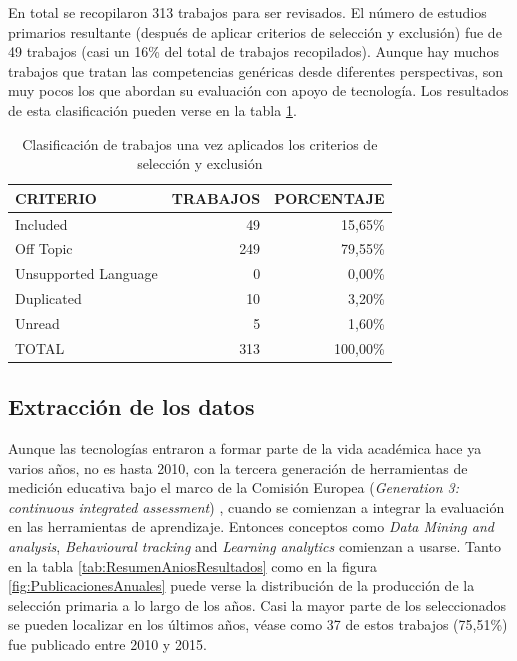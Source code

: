 En total se recopilaron 313 trabajos para ser revisados. El número de estudios primarios resultante (después de aplicar criterios de selección y exclusión) fue de 49 trabajos (casi un 16\% del total de trabajos recopilados). Aunque hay muchos trabajos que tratan las competencias genéricas desde diferentes perspectivas, son muy pocos los que abordan su evaluación con apoyo de tecnología. Los resultados de esta clasificación pueden verse en la tabla \ref{tab:ResumenSelecccionResultados}.

\begin{table}
  \begin{center}
  \begin{tabular}{| m{4cm} | r | r |}
    \hline
    CRITERIO & TRABAJOS & PORCENTAJE\\
    \hline
    \hline 
    Included & 49 & 15,65\% \\
    \hline
    Off Topic & 249 & 79,55\% \\
    \hline
    Unsupported Language & 0 & 0,00\% \\
    \hline
    Duplicated & 10 & 3,20\% \\
    \hline
    Unread & 5 & 1,60\% \\
    \hline
    TOTAL & 313 & 100,00\% \\
    \hline
  \end{tabular}
\end{center}
\caption{Clasificación de trabajos una vez aplicados los criterios de selección y exclusión}
\label{tab:ResumenSelecccionResultados}
\end{table} 

\subsection{Extracción de los datos}

Aunque las tecnologías entraron a formar parte de la vida académica hace ya varios años, no es hasta 2010, con la tercera generación de herramientas de medición educativa bajo el marco de la Comisión Europea (\emph{Generation 3: continuous integrated assessment}) \cite{Redecker:2013}, cuando se comienzan a integrar la evaluación en las herramientas de aprendizaje. Entonces conceptos como \emph{Data Mining and analysis}, \emph{Behavioural tracking} and \emph{Learning analytics} comienzan a usarse. Tanto en la tabla \ref{tab:ResumenAniosResultados} como en la figura \ref{fig:PublicacionesAnuales} puede verse la distribución de la producción de la selección primaria a lo largo de los años. Casi la mayor parte de los seleccionados se pueden localizar en los últimos años, véase como 37 de estos trabajos (75,51\%) fue publicado entre 2010 y 2015.

